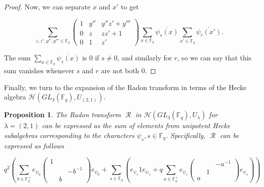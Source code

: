 \documentclass[12pt,reqno]{amsart}
\newtheorem{prop}[thm]{Proposition}
\theoremstyle{definition}
\theoremstyle{remark}
\numberwithin{equation}{section}
\newcommand{\GL}[1]{GL_{#1}(\mathbb{F}_q)}
\DeclareMathOperator{\R}{\mathcal{R}}
\begin{document}
\begin{proof}
    Now, we can separate $x$ and $x'$ to get

    \begin{equation*}
        \sum_{z, z', y'', y''' \in \mathbb{F}_q} \begin{pmatrix}
            1 & y'' & y''z'+y'''\\
            0 & z & zz'+1\\
            0 & 1 & z'
        \end{pmatrix}
        \sum_{x \in \mathbb{F}_q}\overline{\psi_s(x)} \sum_{x' \in \mathbb{F}_q}\overline{\psi_r(x')}.
    \end{equation*}

    The sum $\sum_{x \in \mathbb{F}_q} \overline{\psi_s(x)} $ is $0$ if $s \ne 0$, and similarly for $r$, so we can say that this sum vanishes whenever $s$ and $r$ are not both $0$.
\end{proof}

Finally, we turn to the expansion of the Radon transform in terms of the Hecke algebra $\mathcal{H}(\GL{3},U_{(2,1)})$. %

\begin{prop}\label{Radon_transform_decomposition}
    The Radon transform $\R$ in $\mathcal{H}(\GL{3}, U_\lambda)$ for $\lambda = (2,1)$ can be expressed as the sum of elements from unipotent Hecke subalgebras corresponding to the characters $\psi_s,s\in\mathbb{F}_q$. Specifically, $\R$ can be expressed as follows

    \begin{equation*}
        q^2\left(\sum_{b \in \mathbb{F}_q^\times}e_{\psi_0} \begin{pmatrix}
            1 & &\\
            & & -b^{-1}\\
            & b &
        \end{pmatrix}e_{\psi_0} + 
        \sum_{s \in \mathbb{F}_q}\left( e_{\psi_s} 1 e_{\psi_s} + q\sum_{a \in \mathbb{F}_q^\times}e_{\psi_s}\begin{pmatrix}
            & & -a^{-1}\\
            & 1 &\\
            a & &
        \end{pmatrix} e_{\psi_s}\right)\right)
    \end{equation*}
\end{prop}

\end{document}
